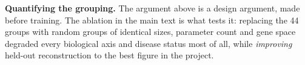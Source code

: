 \textbf{Quantifying the grouping.} The argument above is a
design argument, made before training. The ablation in
the main text is what tests it: replacing the 44 groups with random groups of
identical sizes, parameter count and gene space degraded every biological axis
and disease status most of all, while \emph{improving} held-out reconstruction
to the best figure in the project. 
